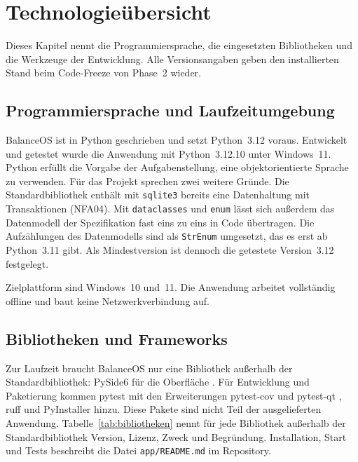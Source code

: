 \section{Technologieübersicht}
Dieses Kapitel nennt die Programmiersprache, die eingesetzten Bibliotheken und die Werkzeuge der Entwicklung. Alle Versionsangaben geben den installierten Stand beim Code-Freeze von Phase~2 wieder.

\subsection{Programmiersprache und Laufzeitumgebung}
BalanceOS ist in Python geschrieben und setzt Python~3.12 voraus. Entwickelt und getestet wurde die Anwendung mit Python~3.12.10 unter Windows~11. Python erfüllt die Vorgabe der Aufgabenstellung, eine objektorientierte Sprache zu verwenden. Für das Projekt sprechen zwei weitere Gründe. Die Standardbibliothek enthält mit \texttt{sqlite3} bereits eine Datenhaltung mit Transaktionen (NFA04). Mit \texttt{dataclasses} und \texttt{enum} lässt sich außerdem das Datenmodell der Spezifikation fast eins zu eins in Code übertragen. Die Aufzählungen des Datenmodells sind als \texttt{StrEnum} umgesetzt, das es erst ab Python~3.11 gibt. Als Mindestversion ist dennoch die getestete Version~3.12 festgelegt.

Zielplattform sind Windows~10 und~11. Die Anwendung arbeitet vollständig offline und baut keine Netzwerkverbindung auf.

\subsection{Bibliotheken und Frameworks}
Zur Laufzeit braucht BalanceOS nur eine Bibliothek außerhalb der Standardbibliothek: PySide6 für die Oberfläche \parencite{pyside6}. Für Entwicklung und Paketierung kommen pytest \parencite{pytest} mit den Erweiterungen pytest-cov \parencite{pytestcov} und pytest-qt \parencite{pytestqt}, ruff \parencite{ruff} und PyInstaller \parencite{pyinstaller} hinzu. Diese Pakete sind nicht Teil der ausgelieferten Anwendung. Tabelle~\ref{tab:bibliotheken} nennt für jede Bibliothek außerhalb der Standardbibliothek Version, Lizenz, Zweck und Begründung. Installation, Start und Tests beschreibt die Datei \texttt{app/README.md} im Repository.

